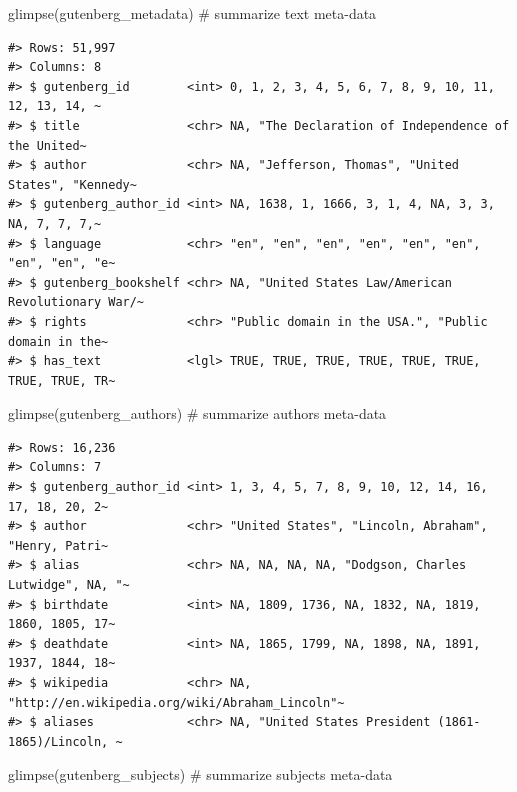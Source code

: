 \documentclass[
  letterpaper,
]{latex/krantz}
\newenvironment{Shaded}{\begin{snugshade}}{\end{snugshade}}
\newcommand{\CommentTok}[1]{\textcolor[rgb]{0.37,0.37,0.37}{#1}}
\newcommand{\FunctionTok}[1]{\textcolor[rgb]{0.28,0.35,0.67}{#1}}
\newcommand{\NormalTok}[1]{\textcolor[rgb]{0.00,0.23,0.31}{#1}}
\begin{document}
\begin{Shaded}
\begin{Highlighting}[]
\FunctionTok{glimpse}\NormalTok{(gutenberg\_metadata) }\CommentTok{\# summarize text meta{-}data}
\end{Highlighting}
\end{Shaded}

\begin{verbatim}
#> Rows: 51,997
#> Columns: 8
#> $ gutenberg_id        <int> 0, 1, 2, 3, 4, 5, 6, 7, 8, 9, 10, 11, 12, 13, 14, ~
#> $ title               <chr> NA, "The Declaration of Independence of the United~
#> $ author              <chr> NA, "Jefferson, Thomas", "United States", "Kennedy~
#> $ gutenberg_author_id <int> NA, 1638, 1, 1666, 3, 1, 4, NA, 3, 3, NA, 7, 7, 7,~
#> $ language            <chr> "en", "en", "en", "en", "en", "en", "en", "en", "e~
#> $ gutenberg_bookshelf <chr> NA, "United States Law/American Revolutionary War/~
#> $ rights              <chr> "Public domain in the USA.", "Public domain in the~
#> $ has_text            <lgl> TRUE, TRUE, TRUE, TRUE, TRUE, TRUE, TRUE, TRUE, TR~
\end{verbatim}

\begin{Shaded}
\begin{Highlighting}[]
\FunctionTok{glimpse}\NormalTok{(gutenberg\_authors) }\CommentTok{\# summarize authors meta{-}data}
\end{Highlighting}
\end{Shaded}

\begin{verbatim}
#> Rows: 16,236
#> Columns: 7
#> $ gutenberg_author_id <int> 1, 3, 4, 5, 7, 8, 9, 10, 12, 14, 16, 17, 18, 20, 2~
#> $ author              <chr> "United States", "Lincoln, Abraham", "Henry, Patri~
#> $ alias               <chr> NA, NA, NA, NA, "Dodgson, Charles Lutwidge", NA, "~
#> $ birthdate           <int> NA, 1809, 1736, NA, 1832, NA, 1819, 1860, 1805, 17~
#> $ deathdate           <int> NA, 1865, 1799, NA, 1898, NA, 1891, 1937, 1844, 18~
#> $ wikipedia           <chr> NA, "http://en.wikipedia.org/wiki/Abraham_Lincoln"~
#> $ aliases             <chr> NA, "United States President (1861-1865)/Lincoln, ~
\end{verbatim}

\begin{Shaded}
\begin{Highlighting}[]
\FunctionTok{glimpse}\NormalTok{(gutenberg\_subjects) }\CommentTok{\# summarize subjects meta{-}data}
\end{Highlighting}
\end{Shaded}
\end{document}
